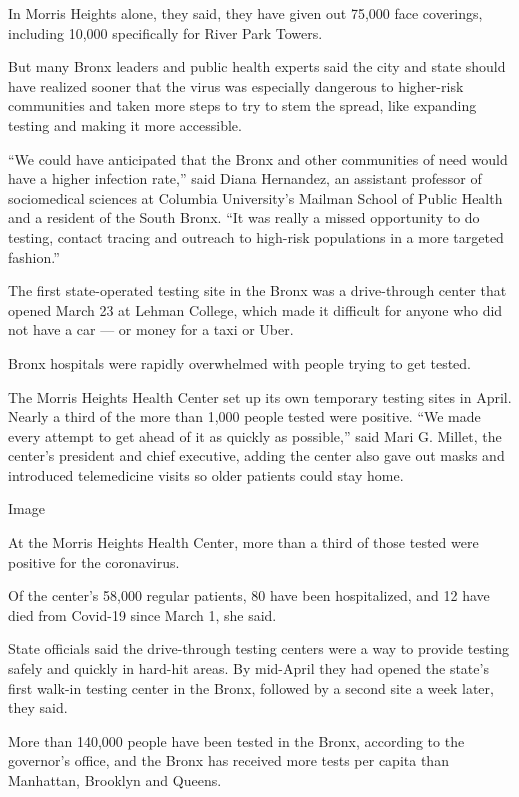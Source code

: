 In Morris Heights alone, they said, they have given out 75,000 face
coverings, including 10,000 specifically for River Park Towers.

But many Bronx leaders and public health experts said the city and state
should have realized sooner that the virus was especially dangerous to
higher-risk communities and taken more steps to try to stem the spread,
like expanding testing and making it more accessible.

``We could have anticipated that the Bronx and other communities of need
would have a higher infection rate,'' said Diana Hernandez, an assistant
professor of sociomedical sciences at Columbia University's Mailman
School of Public Health and a resident of the South Bronx. ``It was
really a missed opportunity to do testing, contact tracing and outreach
to high-risk populations in a more targeted fashion.''

The first state-operated testing site in the Bronx was a drive-through
center that opened March 23 at Lehman College, which made it difficult
for anyone who did not have a car --- or money for a taxi or Uber.

Bronx hospitals were rapidly overwhelmed with people trying to get
tested.

The Morris Heights Health Center set up its own temporary testing sites
in April. Nearly a third of the more than 1,000 people tested were
positive. ``We made every attempt to get ahead of it as quickly as
possible,'' said Mari G. Millet, the center's president and chief
executive, adding the center also gave out masks and introduced
telemedicine visits so older patients could stay home.

Image

At the Morris Heights Health Center, more than a third of those tested
were positive for the coronavirus.

Of the center's 58,000 regular patients, 80 have been hospitalized, and
12 have died from Covid-19 since March 1, she said.

State officials said the drive-through testing centers were a way to
provide testing safely and quickly in hard-hit areas. By mid-April they
had opened the state's first walk-in testing center in the Bronx,
followed by a second site a week later, they said.

More than 140,000 people have been tested in the Bronx, according to the
governor's office, and the Bronx has received more tests per capita than
Manhattan, Brooklyn and Queens.

